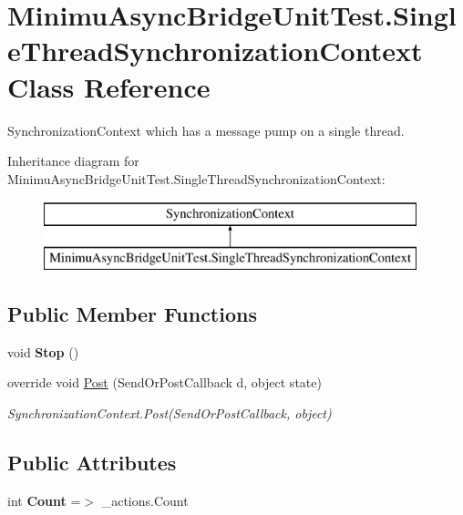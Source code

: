 \hypertarget{class_minimu_async_bridge_unit_test_1_1_single_thread_synchronization_context}{}\section{Minimu\+Async\+Bridge\+Unit\+Test.\+Single\+Thread\+Synchronization\+Context Class Reference}
\label{class_minimu_async_bridge_unit_test_1_1_single_thread_synchronization_context}


Synchronization\+Context which has a message pump on a single thread.  


Inheritance diagram for Minimu\+Async\+Bridge\+Unit\+Test.\+Single\+Thread\+Synchronization\+Context\+:\begin{figure}[H]
\begin{center}
\leavevmode
\includegraphics[height=2.000000cm]{class_minimu_async_bridge_unit_test_1_1_single_thread_synchronization_context}
\end{center}
\end{figure}
\subsection*{Public Member Functions}
\begin{DoxyCompactItemize}
\item 
\mbox{\label{class_minimu_async_bridge_unit_test_1_1_single_thread_synchronization_context_af44938402ef26f6eba97b30101a857ff}} 
void {\bfseries Stop} ()
\item 
override void \hyperlink{class_minimu_async_bridge_unit_test_1_1_single_thread_synchronization_context_a1c03a1c0f78415785d09881bcf103982}{Post} (Send\+Or\+Post\+Callback d, object state)
\begin{DoxyCompactList}\small\item\em Synchronization\+Context.\+Post(\+Send\+Or\+Post\+Callback, object) \end{DoxyCompactList}\end{DoxyCompactItemize}
\subsection*{Public Attributes}
\begin{DoxyCompactItemize}
\item 
\mbox{\label{class_minimu_async_bridge_unit_test_1_1_single_thread_synchronization_context_a035899c93f3788e59c565f633b8b6a8e}} 
int {\bfseries Count} =$>$ \+\_\+actions.\+Count
\end{DoxyCompactItemize}
